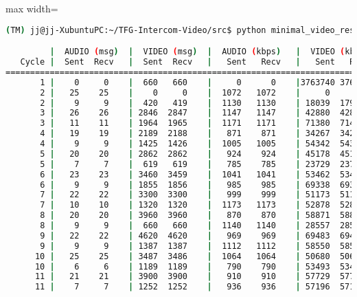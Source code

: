 \begin{adjustbox}{max width=\textwidth}
\begin{lstlisting}[language=bash,basicstyle=\ttfamily\scriptsize]
(TM) jj@jj-XubuntuPC:~/TFG-Intercom-Video/src$ python minimal_video_resolution.py --show_video --show_stats --camera_index 1 -z 12 -w 640 -g 480

         |  AUDIO (msg)  |  VIDEO (msg)  |  AUDIO (kbps)   |  VIDEO (kbps)   |     CPU (%) 
   Cycle |  Sent  Recv   |  Sent  Recv   |   Sent   Recv   |   Sent   Recv   | Program System
================================================================================================
       1 |    0     0    |  660   660    |     0      0    |3763740 3763740    |   0    100       
       2 |   25    25    |    0     0    |  1072   1072    |     0      0    |  23     73       
       2 |    9     9    |  420   419    |  1130   1130    | 18039  17996    |  46     74       
       3 |   26    26    | 2846  2847    |  1147   1147    | 42880  42895    |  53     73       
       3 |   11    11    | 1964  1965    |  1171   1171    | 71380  71417    |  55     72       
       4 |   19    19    | 2189  2188    |   871    871    | 34267  34251    |  37     76       
       4 |    9     9    | 1425  1426    |  1005   1005    | 54342  54381    |  44     78       
       5 |   20    20    | 2862  2862    |   924    924    | 45178  45178    |  43     76       
       5 |    7     7    |  619   619    |   785    785    | 23729  23729    |  41     76       
       6 |   23    23    | 3460  3459    |  1041   1041    | 53462  53447    |  52     75       
       6 |    9     9    | 1855  1856    |   985    985    | 69338  69375    |  83     74       
       7 |   22    22    | 3300  3300    |   999    999    | 51173  51173    |  66     75       
       7 |   10    10    | 1320  1320    |  1173   1173    | 52878  52878    |  50     76       
       8 |   20    20    | 3960  3960    |   870    870    | 58871  58871    |  55     74       
       8 |    9     9    |  660   660    |  1140   1140    | 28557  28557    |  50     75       
       9 |   22    22    | 4620  4620    |   969    969    | 69483  69483    |  57     74       
       9 |    9     9    | 1387  1387    |  1112   1112    | 58550  58550    |  41     72       
      10 |   25    25    | 3487  3486    |  1064   1064    | 50680  50665    |  36     72       
      10 |    6     6    | 1189  1189    |   790    790    | 53493  53493    |  48     71       
      11 |   21    21    | 3900  3900    |   910    910    | 57729  57729    |  46     72       
      11 |    7     7    | 1252  1252    |   936    936    | 57196  57196    |  40     74       

\end{lstlisting}
\end{adjustbox}

